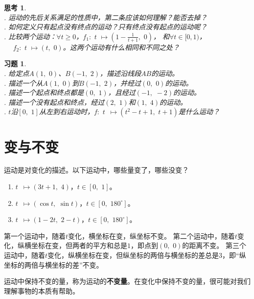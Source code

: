 \documentclass[12pt,UTF8]{ctexbook}
\newtheorem{sk}{思考}[section]
\newtheorem{xt}{习题}[section]
\begin{document}
\begin{sk}
    \mbox{} \\
    . 运动的先后关系满足的性质中，第二条应该如何理解？能否去掉？\\
    . 如何定义只有起点没有终点的运动？只有终点没有起点的运动呢？\\
    . 比较两个运动：$\forall t \geqslant 0$，$f_1:\,\, t \,\, \mapsto (1 - \frac{1}{t+1}, \,\, 0)$，
    和$\forall t \in [0, 1)$，\\
    \indent $\quad \,\, f_2:\,\, t \,\, \mapsto (t, \,\,0)$。这两个运动有什么相同和不同之处？
\end{sk}

\begin{xt}
    \mbox{} \\
    . 给定点$A(1,\,\,0)$、$B(-1,\,\,2)$，描述沿线段$AB$的运动。\\
    . 描述一个从$A(1,\,\,0)$到$B(-1,\,\,2)$，并经过$(0,\,\,0)$的运动。\\
    . 描述一个起点和终点都是$(0, \,\, 1)$，且经过$(-1,\,\, -2)$的运动。\\
    . 描述一个没有起点和终点，经过$(2,\,\, 1)$和$(1,\,\, 4)$的运动。\\
    . $t$沿$[0,\,\,1]$从左到右运动时，$f: \,\, t \,\,\, \mapsto (t^2 - t + 1, \,\, t + 1)$是什么运动？
\end{xt}

\section{变与不变}
运动是对变化的描述。以下运动中，哪些量变了，哪些没变？
\begin{enumerate}
    \item $ t \,\,\,\mapsto (3t+1, \,\, 4)$，$t\in[0,\,\,1]$。
    \item $ t \,\,\,\mapsto (\cos{t}, \,\, \sin{t})$，$t\in[0,\,\,180^\circ]$。
    \item $ t \,\,\,\mapsto (1 - 2t, \,\, 2 - t)$，$t\in[0,\,\,180^\circ]$。
\end{enumerate}
第一个运动中，随着$t$变化，横坐标在变，纵坐标不变。
第二个运动中，随着$t$变化，纵横坐标在变，但两者的平方和总是$1$，即点到$(0,\,\,0)$的距离不变。
第三个运动中，随着$t$变化，纵横坐标在变，但纵坐标的两倍与横坐标的差总是$3$，即“纵坐标的两倍与横坐标的差”不变。

运动中保持不变的量，称为运动的\textbf{不变量}。在变化中保持不变的量，很可能对我们理解事物的本质有帮助。
\end{document}
